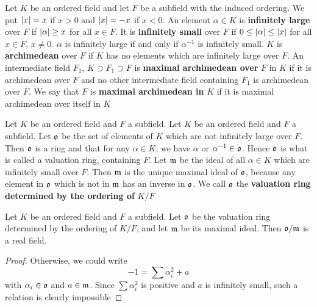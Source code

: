 \documentclass[11pt]{article}
\begin{document}
Let \(K\) be an ordered field and let \(F\) be a subfield with the induced
ordering. We put \(\abs{x}=x\) if \(x>0\) and \(\abs{x}=-x\) if \(x<0\). An
element \(\alpha\in K\) is \textbf{infinitely large} over \(F\) if \(\abs{\alpha}\ge x\) for all
\(x\in F\). It is \textbf{infinitely small} over \(F\) if \(0\le\abs{\alpha}\le\abs{x}\) for
all \(x\in F\), \(x\neq0\). \(\alpha\) is infinitely large if and only if \(\alpha^{-1}\) is
infinitely small. \(K\) is \textbf{archimedean} over \(F\) if \(K\) has no elements
which are infinitely large over \(F\). An intermediate field \(F_1\),
\(K\supset F_1\supset F\) is \textbf{maximal archimedean over} \(F\) in \(K\) if it is
archimedean over \(F\) and no other intermediate field containing \(F_1\) is
archimedean over \(F\). We say that \(F\) is \textbf{maximal archimedean in} \(K\)
if it is maximal archimedean over itself in \(K\)

Let \(K\) be an ordered field and \(F\) a subfield. Let \(K\) be an ordered
field and \(F\) a subfield. Let \(\mathfrak{o}\) be the set of elements of \(K\)
which are not infinitely large over \(F\). Then \(\mathfrak{o}\) is a ring and that
for any \(\alpha\in K\), we have \(\alpha\) or \(\alpha^{-1}\in\mathfrak{o}\). Hence \(\mathfrak{o}\) is what is
called a valuation ring, containing \(F\). Let \(\mathfrak{m}\) be the ideal of all
\(\alpha\in K\) which are infinitely small over \(F\). Then \(\mathfrak{m}\) is the unique
maximal ideal of \(\mathfrak{o}\), because any element in \(\mathfrak{o}\) which is not in
\(\mathfrak{m}\) has an inverse in \(\mathfrak{o}\). We call \(\mathfrak{o}\) the
\textbf{valuation ring determined by the ordering of} \(K/F\)

\begin{proposition}[]
Let \(K\) be an ordered field and \(F\) a subfield. Let \(\mathfrak{o}\) be the
valuation ring determined by the ordering of \(K/F\), and let \(\mathfrak{m}\) be its
maximal ideal. Then \(\mathfrak{o}/\mathfrak{m}\) is a real field.
\end{proposition}

\begin{proof}
Otherwise, we could write
\begin{equation*}
-1=\displaystyle\sum\alpha_i^2+a
\end{equation*}
with \(\alpha_i\in\mathfrak{o}\) and \(a\in\mathfrak{m}\). Since \(\sum\alpha_i^2\) is positive and \(a\) is
infinitely small, such a relation is clearly impossible
\end{proof}
\end{document}
